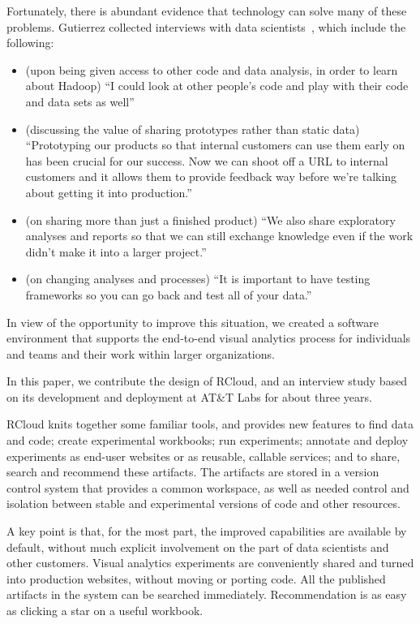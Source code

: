 Fortunately, there is abundant evidence that technology can
solve many of these problems.
Gutierrez collected interviews with data scientists~\cite{Gutierrez:2014:DSA},
which include the following:

\begin{itemize}
\item (upon being given access to other code and data analysis, in
order to learn about Hadoop) ``I could look at other people’s code
and play with their code and data sets as well''
\item (discussing the value of sharing prototypes rather than static
data) ``Prototyping our products so that internal
customers can use them early on has been crucial for
our success. Now we can shoot off a URL to internal
customers and it allows them to provide feedback way before
we're talking about getting it into production.''
\item (on sharing more than just a finished product) ``We also share
exploratory analyses and reports so that we can still exchange
knowledge even if the work didn't make it into a larger project.''
\item (on changing analyses and processes) ``It is important to
have testing frameworks so you can go back and test all
of your data.''
\end{itemize}

In view of the opportunity to improve this situation,
we created a software environment that supports the end-to-end
visual analytics process for individuals and teams and
their work within larger organizations.

In this paper, we contribute the design of RCloud, and an
interview study based on its development and deployment
at AT\&T Labs for about three years.

RCloud knits together some familiar tools, and 
provides new features to find data and code; create experimental workbooks;
run experiments; annotate and deploy experiments as end-user websites or
as reusable, callable services; and to share, search and recommend these artifacts. The artifacts are stored in a version
control system that provides a common workspace, as well as needed control
and isolation between stable and experimental versions of code and other
resources. 

A key point is that, for the most part, the improved capabilities are
available by default, without much explicit involvement on the part of
data scientists and other customers. Visual analytics experiments are
conveniently shared and turned into production websites, without moving
or porting code. All the published artifacts in the system can be
searched immediately. Recommendation is as easy as clicking a star
on a useful workbook.

